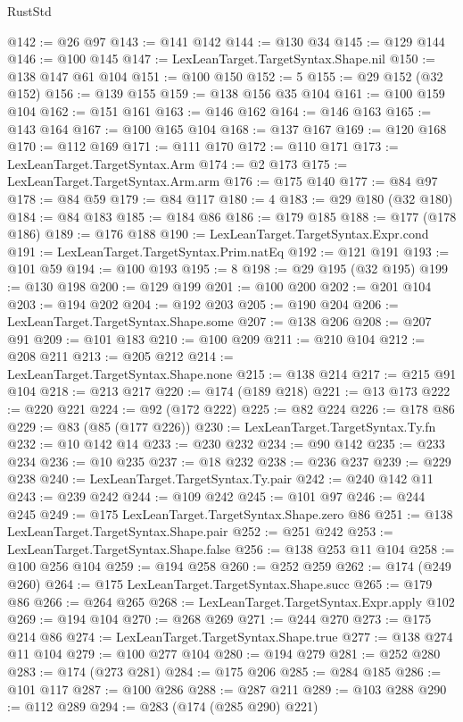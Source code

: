 \begin{lexlean}{RustStd}
\begin{coremodule}
@142 := @26 @97
@143 := @141 @142
@144 := @130 @34
@145 := @129 @144
@146 := @100 @145
@147 := LexLeanTarget.TargetSyntax.Shape.nil
@150 := @138 @147 @61 @104
@151 := @100 @150
@152 := 5
@155 := @29 @152 (@32 @152)
@156 := @139 @155
@159 := @138 @156 @35 @104
@161 := @100 @159 @104
@162 := @151 @161
@163 := @146 @162
@164 := @146 @163
@165 := @143 @164
@167 := @100 @165 @104
@168 := @137 @167
@169 := @120 @168
@170 := @112 @169
@171 := @111 @170
@172 := @110 @171
@173 := LexLeanTarget.TargetSyntax.Arm
@174 := @2 @173
@175 := LexLeanTarget.TargetSyntax.Arm.arm
@176 := @175 @140
@177 := @84 @97
@178 := @84 @59
@179 := @84 @117
@180 := 4
@183 := @29 @180 (@32 @180)
@184 := @84 @183
@185 := @184 @86
@186 := @179 @185
@188 := @177 (@178 @186)
@189 := @176 @188
@190 := LexLeanTarget.TargetSyntax.Expr.cond
@191 := LexLeanTarget.TargetSyntax.Prim.natEq
@192 := @121 @191
@193 := @101 @59
@194 := @100 @193
@195 := 8
@198 := @29 @195 (@32 @195)
@199 := @130 @198
@200 := @129 @199
@201 := @100 @200
@202 := @201 @104
@203 := @194 @202
@204 := @192 @203
@205 := @190 @204
@206 := LexLeanTarget.TargetSyntax.Shape.some
@207 := @138 @206
@208 := @207 @91
@209 := @101 @183
@210 := @100 @209
@211 := @210 @104
@212 := @208 @211
@213 := @205 @212
@214 := LexLeanTarget.TargetSyntax.Shape.none
@215 := @138 @214
@217 := @215 @91 @104
@218 := @213 @217
@220 := @174 (@189 @218)
@221 := @13 @173
@222 := @220 @221
@224 := @92 (@172 @222)
@225 := @82 @224
@226 := @178 @86
@229 := @83 (@85 (@177 @226))
@230 := LexLeanTarget.TargetSyntax.Ty.fn
@232 := @10 @142 @14
@233 := @230 @232
@234 := @90 @142
@235 := @233 @234
@236 := @10 @235
@237 := @18 @232
@238 := @236 @237
@239 := @229 @238
@240 := LexLeanTarget.TargetSyntax.Ty.pair
@242 := @240 @142 @11
@243 := @239 @242
@244 := @109 @242
@245 := @101 @97
@246 := @244 @245
@249 := @175 LexLeanTarget.TargetSyntax.Shape.zero @86
@251 := @138 LexLeanTarget.TargetSyntax.Shape.pair
@252 := @251 @242
@253 := LexLeanTarget.TargetSyntax.Shape.false
@256 := @138 @253 @11 @104
@258 := @100 @256 @104
@259 := @194 @258
@260 := @252 @259
@262 := @174 (@249 @260)
@264 := @175 LexLeanTarget.TargetSyntax.Shape.succ
@265 := @179 @86
@266 := @264 @265
@268 := LexLeanTarget.TargetSyntax.Expr.apply @102
@269 := @194 @104
@270 := @268 @269
@271 := @244 @270
@273 := @175 @214 @86
@274 := LexLeanTarget.TargetSyntax.Shape.true
@277 := @138 @274 @11 @104
@279 := @100 @277 @104
@280 := @194 @279
@281 := @252 @280
@283 := @174 (@273 @281)
@284 := @175 @206
@285 := @284 @185
@286 := @101 @117
@287 := @100 @286
@288 := @287 @211
@289 := @103 @288
@290 := @112 @289
@294 := @283 (@174 (@285 @290) @221)

\end{coremodule}
\end{lexlean}
